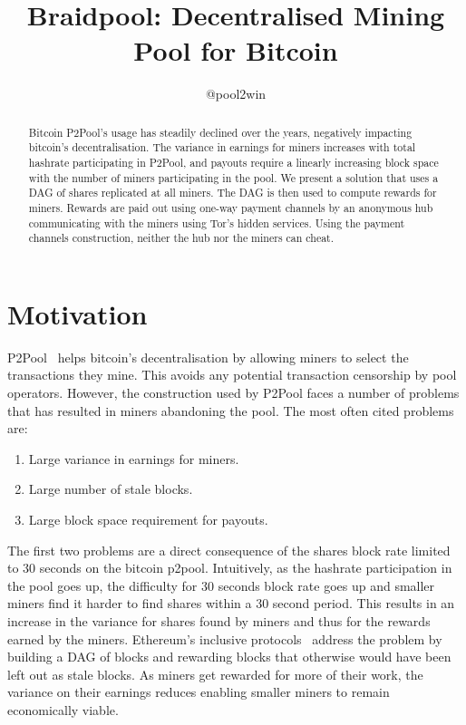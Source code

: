 \documentclass{article}
\title{Braidpool: Decentralised Mining Pool for Bitcoin}
\author{@pool2win}
\date{}
\begin{document}
\maketitle

\begin{abstract}
  Bitcoin P2Pool's usage has steadily declined over the years,
  negatively impacting bitcoin's decentralisation. The variance in
  earnings for miners increases with total hashrate participating in
  P2Pool, and payouts require a linearly increasing block space with
  the number of miners participating in the pool. We present a
  solution that uses a DAG of shares replicated at all miners. The DAG
  is then used to compute rewards for miners. Rewards are paid out
  using one-way payment channels by an anonymous hub communicating
  with the miners using Tor's hidden services. Using the payment
  channels construction, neither the hub nor the miners can cheat.
\end{abstract}
   
\section{Motivation}

P2Pool~\cite{p2pool:wiki} helps bitcoin's decentralisation by allowing
miners to select the transactions they mine. This avoids any potential
transaction censorship by pool operators. However, the construction
used by P2Pool faces a number of problems that has resulted in miners
abandoning the pool. The most often cited problems are:

\begin{enumerate}
\item Large variance in earnings for miners.
\item Large number of stale blocks.
\item Large block space requirement for payouts.
\end{enumerate}

The first two problems are a direct consequence of the shares block
rate limited to 30 seconds on the bitcoin p2pool. Intuitively, as the
hashrate participation in the pool goes up, the difficulty for 30
seconds block rate goes up and smaller miners find it harder to find
shares within a 30 second period. This results in an increase in the
variance for shares found by miners and thus for the rewards earned by
the miners. Ethereum's inclusive protocols~\cite{inclusive-protocols}
address the problem by building a DAG of blocks and rewarding blocks
that otherwise would have been left out as stale blocks. As miners get
rewarded for more of their work, the variance on their earnings
reduces enabling smaller miners to remain economically viable.
\end{document}
